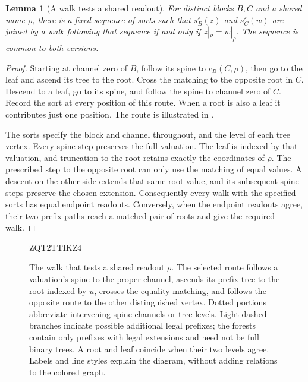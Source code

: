 \documentclass[11pt]{article}
\newtheorem{lemma}[theorem]{Lemma}
\theoremstyle{definition}
\begin{document}
\begin{lemma}[A walk tests a shared readout]
\label{graph:readout-walk}
For distinct blocks \(B,C\) and a shared name \(\rho\), there is a
fixed sequence of sorts such that
\(s_B^\varepsilon(z)\) and \(s_C^\varepsilon(w)\) are joined by a walk following
that sequence if and only if \(z|_\rho=w|_\rho\).
The sequence is common to both versions.
\end{lemma}

\begin{proof}
Starting at channel zero of \(B\), follow its spine to
\(c_B(C,\rho)\), then go to the leaf and ascend its tree to the root.
Cross the matching to the opposite root in \(C\).
Descend to a leaf, go to its spine, and follow the spine to channel
zero of \(C\).
Record the sort at every position of this route.
When a root is also a leaf it contributes just one position.
The route is illustrated in .

The sorts specify the block and channel throughout, and the level
of each tree vertex.  Every spine step preserves the full valuation.
The leaf is indexed by that valuation, and truncation to the root
retains exactly the coordinates of \(\rho\).
The prescribed step to the opposite root can only use the matching
of equal values.  A descent on the other side extends that same root
value, and its subsequent spine steps preserve the chosen extension.
Consequently every walk with the specified sorts has equal endpoint
readouts.  Conversely, when the endpoint readouts agree, their two
prefix paths reach a matched pair of roots and give the required walk.
\end{proof}

\begin{figure}[tb]

ZQT2TTIKZ4
\caption{The walk that tests a shared readout \(\rho\).
The selected route follows a valuation's spine to the proper channel,
ascends its prefix tree to the root indexed by \(u\), crosses the
equality matching, and follows the opposite route to the other
distinguished vertex.
Dotted portions abbreviate intervening spine channels or tree levels.
Light dashed branches indicate possible additional legal prefixes;
the forests contain only prefixes with legal extensions and need not
be full binary trees.
A root and leaf coincide when their two levels agree.
Labels and line styles explain the diagram, without adding relations
to the colored graph.}
\label{graph:fig-readout-route}
\end{figure}
\end{document}
